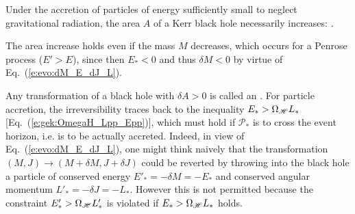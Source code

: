 \begin{prop}
\label{p:evo:area_law_Kerr}
Under the accretion of particles of energy sufficiently small to neglect
gravitational radiation, the area $A$ of a Kerr black hole
necessarily increases:
\be \label{e:evo:dA_positive_Kerr}
     .
\ee
\end{prop}

\begin{remark}
The area increase holds even if the mass $M$ decreases, which occurs
for a Penrose process ($E'>E$), since then $E_*<0$ and thus $\delta M < 0$
by virtue of
Eq.~(\ref{e:evo:dM_E_dJ_L}).
\end{remark}


Any transformation of a black hole with $\delta A > 0$ is called an
 .
For particle accretion, the irreversibility traces back
to the inequality $E_* > \Omega_{\mathscr{H}}  L_*$ [Eq.~(\ref{e:gek:OmegaH_Lpp_Epp})],
which must hold if $\mathscr{P}_*$ is to cross the event horizon, i.e. is to be actually
accreted. Indeed, in view of Eq.~(\ref{e:evo:dM_E_dJ_L}),
one might think naively that the transformation $(M,J)\to (M+\delta M, J+\delta J)$
could be reverted by throwing into the black hole a particle of conserved energy
$E'_* = -\delta M = - E_*$
and conserved angular momentum $L'_* = -\delta J = - L_*$. However this is not permitted
because the constraint $E'_* > \Omega_{\mathscr{H}}  L'_*$ is violated if
$E_* > \Omega_{\mathscr{H}} L_*$ holds.


